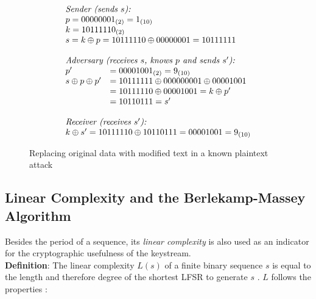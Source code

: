 \begin{figure}[htpb]
	\[\begin{array}{ll}
		\multicolumn{2}{l}{\text{\it Sender (sends $s$):}}\\
		\multicolumn{2}{l}{p = 0000 0001_{(2)} = 1_{(10)}}\\
		\multicolumn{2}{l}{k = 1011 1110_{(2)}}\\
		\multicolumn{2}{l}{s = k \oplus p = 1011 1110 \oplus 0000 0001 = 1011 1111}\\
		\\
		\multicolumn{2}{l}{\text{\it Adversary (receives $s$, knows $p$ and sends $s'$):}}\\
		p' &= 0000 1001_{(2)} = 9_{(10)}\\
		s \oplus p \oplus p' &= 1011 1111 \oplus 0000 00001 \oplus 0000 1001 \\
		&= 1011 1110 \oplus 0000 1001 = k \oplus p' \\
		&= 1011 0111 = s' \\
		\\
		\multicolumn{2}{l}{\text{\it Receiver (receives $s'$):}}\\
		\multicolumn{2}{l}{k \oplus s' = 1011 1110 \oplus 1011 0111 = 0000 1001 =  9_{(10)}}
	\end{array}\]
	\caption{Replacing original data with modified text in a known plaintext attack }
	\label{fig:text-replacment}
\end{figure}


\subsection{Linear Complexity and the Berlekamp-Massey Algorithm}

Besides the period of a sequence, its \emph{linear complexity} is also used as an indicator for the cryptographic usefulness of the keystream. \\

\textbf{Definition}: The linear complexity $L(s)$ of a finite binary sequence $s$ is equal to the length and therefore degree of the shortest LFSR to generate $s$ \cite[p. 233]{Smart.2016}. $L$ follows the properties \cite[pp. 20-21]{Cusick.2009}:\\

